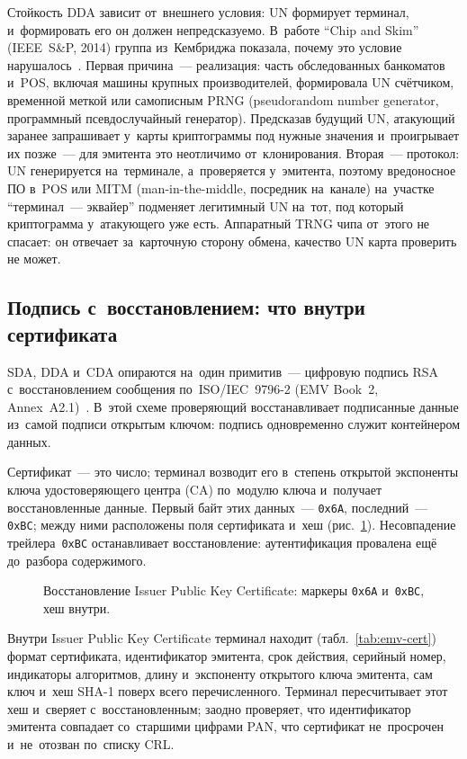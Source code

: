 Стойкость DDA зависит от~внешнего условия: UN формирует терминал,
и~формировать его он должен непредсказуемо. В~работе \enquote{Chip and Skim}
(IEEE~S\&P, 2014) группа из~Кембриджа показала, почему это условие нарушалось~\cite{bond-chipandskim-2014}. Первая причина~--- реализация: часть
обследованных банкоматов и~POS, включая машины крупных производителей,
формировала UN счётчиком, временной меткой или самописным PRNG (pseudorandom
number generator, программный псевдослучайный генератор). Предсказав будущий
UN, атакующий заранее запрашивает у~карты криптограммы под нужные значения
и~проигрывает их позже~--- для эмитента это неотличимо от~клонирования.
Вторая~--- протокол: UN генерируется на~терминале, а~проверяется у~эмитента,
поэтому вредоносное ПО в~POS или MITM (man-in-the-middle, посредник на~канале)
на~участке \enquote{терминал~--- эквайер} подменяет легитимный UN на~тот,
под который криптограмма у~атакующего уже есть. Аппаратный TRNG чипа от~этого
не спасает: он отвечает за~карточную сторону обмена, качество UN карта
проверить не может.

\subsection*{Подпись с~восстановлением: что внутри сертификата}\label{sec:emv-signature}

SDA, DDA и~CDA опираются на~один примитив~--- цифровую подпись RSA
с~восстановлением сообщения по~ISO/IEC~9796-2 (EMV Book~2,
Annex~A2.1)~\cite{emvco-book2}. В~этой схеме проверяющий восстанавливает
подписанные данные из~самой подписи открытым ключом: подпись одновременно
служит контейнером данных.

Сертификат~--- это число; терминал возводит его в~степень открытой экспоненты
ключа удостоверяющего центра (CA) по~модулю ключа и~получает восстановленные
данные. Первый байт этих данных~--- \texttt{0x6A}, последний~--- \texttt{0xBC};
между ними расположены поля сертификата и~хеш (рис.~\ref{fig:emv-cert-recovery}).
Несовпадение трейлера~\texttt{0xBC} останавливает восстановление:
аутентификация провалена ещё до~разбора содержимого.

\begin{figure}[tbp]
  \centering
  \caption{Восстановление Issuer Public Key Certificate: маркеры \texttt{0x6A} и~\texttt{0xBC}, хеш внутри.}\label{fig:emv-cert-recovery}
\end{figure}

Внутри Issuer Public Key Certificate терминал находит
(табл.~\ref{tab:emv-cert}) формат сертификата, идентификатор эмитента, срок
действия, серийный номер, индикаторы алгоритмов, длину и~экспоненту открытого
ключа эмитента, сам ключ и~хеш SHA-1 поверх всего перечисленного. Терминал
пересчитывает этот хеш и~сверяет с~восстановленным; заодно проверяет, что
идентификатор эмитента совпадает со~старшими цифрами PAN, что сертификат
не~просрочен и~не~отозван по~списку CRL.

